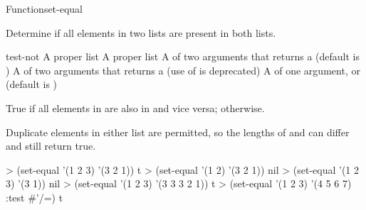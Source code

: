 \documentclass[10pt,twoside,english,pdftex]{article}
\begin{document}
\begin{functiondoc}{Function}{set-equal}{
     
    \returns{} }

\fnsyntax

\fnpurpose Determine if all elements in two lists are present in both lists.

\fnpackage {}

\fnmodule {}

\fnargs
\begin{args}{test-not}
\arg[list-1] A proper list
\arg[list-2] A proper list
\arg[test] A  of two arguments that returns a
 (default is ) 
 A  of two arguments that returns a
 (use of  is deprecated)
\arg[key] A  of one argument, or \nil{} (default is \nil)
\end{args}

\fnreturns True if all elements in  are also in
 and vice versa; \nil{} otherwise.

\fndescription Duplicate elements in either list are permitted, so the
lengths of  and  can differ and still return
true.

\fnexamples
%
\W\supp
\begin{example}
> (set-equal '(1 2 3) '(3 2 1))
t
> (set-equal '(1 2) '(3 2 1))
nil\goodpagebreak
> (set-equal '(1 2 3) '(3 1))
nil
> (set-equal '(1 2 3) '(3 3 3 2 1))
t
> (set-equal '(1 2 3) '(4 5 6 7) :test #'/=)
t
\end{example}

\end{functiondoc}

\end{document}

